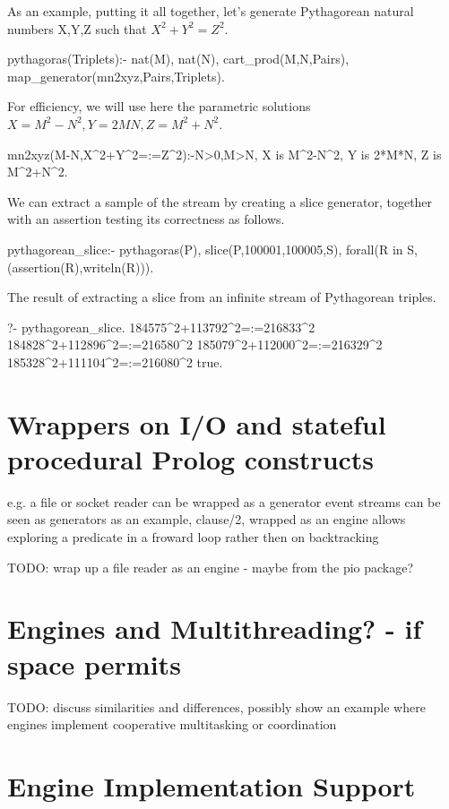 \documentclass{new_tlp}
\begin{document}
As an example, putting it all together, let's generate Pythagorean natural numbers X,Y,Z such
that $X^2+Y^2=Z^2$.

\begin{code}
pythagoras(Triplets):-
  nat(M),
  nat(N),
  cart_prod(M,N,Pairs),
  map_generator(mn2xyz,Pairs,Triplets).
\end{code}
For efficiency, we will use here the parametric solutions
$X=M^2-N^2, Y=2MN, Z=M^2+N^2$.
\begin{code}
mn2xyz(M-N,X^2+Y^2=:=Z^2):-N>0,M>N,
  X is M^2-N^2,
  Y is 2*M*N,
  Z is M^2+N^2.
\end{code}
We can extract a sample of the stream by creating
a slice generator, together with an assertion testing its correctness as follows.
\begin{code}
pythagorean_slice:-
  pythagoras(P),
  slice(P,100001,100005,S),
  forall(R in S,(assertion(R),writeln(R))).
\end{code}

\BX
The result of extracting a slice from an infinite stream of Pythagorean triples.
\begin{codex}
?- pythagorean_slice.
184575^2+113792^2=:=216833^2
184828^2+112896^2=:=216580^2
185079^2+112000^2=:=216329^2
185328^2+111104^2=:=216080^2
true.
\end{codex}
\EX

\section{Wrappers on I/O and stateful procedural Prolog constructs}

\BI
\I e.g. a file or socket reader can be wrapped as a generator
\I event streams can be seen as generators 
\I as an example, clause/2, wrapped as an engine allows exploring a predicate in a froward loop rather then on backtracking
\EI

{\Large TODO: wrap up a file reader as an engine - maybe from the pio package?}

\section{Engines and Multithreading? - if space permits}

{\Large TODO: discuss similarities and differences, possibly show an example where engines implement cooperative multitasking or coordination}

\section{Engine Implementation Support}
\end{document}
